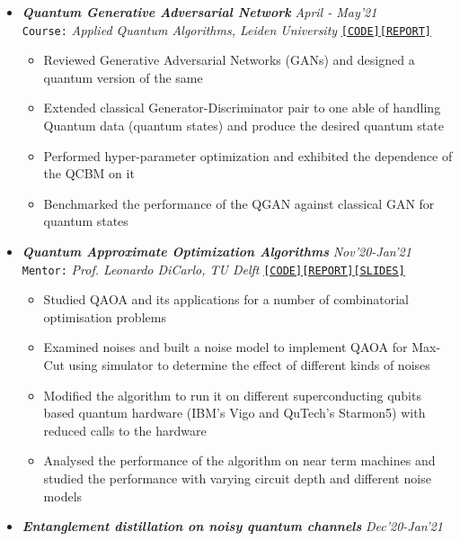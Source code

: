 \documentclass[11pt,a4paper]{article}
\begin{document}
\begin{itemize}
    \item \textbf{\textit{Quantum Generative Adversarial Network}} \hfill \textit{April - May'21}\\
    \texttt{Course:} \textit{Applied Quantum Algorithms, Leiden University} \hfill \href{https://github.com/smitchaudhary/QGANs}{\texttt{[CODE]}}\href{https://github.com/smitchaudhary/QGANs/blob/main/Report.pdf}{\texttt{[REPORT]}}
    \begin{itemize}
        \item Reviewed Generative Adversarial Networks (GANs) and designed a quantum version of the same
        \item Extended classical Generator-Discriminator pair to one able of handling Quantum data (quantum states) and produce the desired quantum state
        \item Performed hyper-parameter optimization and exhibited the dependence of the QCBM on it
        \item Benchmarked the performance of the QGAN against classical GAN for quantum states
    \end{itemize}
    \item \textbf{\textit{Quantum Approximate Optimization Algorithms}} \hfill \textit{Nov'20-Jan'21}\\
    \texttt{Mentor:} \textit{Prof. Leonardo DiCarlo, TU Delft} \hfill
    \href{https://github.com/smitchaudhary/QAOA-MaxCut}{\texttt{[CODE]}}\href{https://github.com/smitchaudhary/QAOA-MaxCut/blob/master/Report.pdf}{\texttt{[REPORT]}}\href{https://github.com/smitchaudhary/QAOA-MaxCut/blob/master/Presentation.pdf}{\texttt{[SLIDES]}}
    \begin{itemize}
        \item Studied QAOA and its applications for a number of combinatorial optimisation problems
        \item Examined noises and built a noise model to implement QAOA for Max-Cut using simulator to determine the effect of different kinds of noises
        \item Modified the algorithm to run it on different superconducting qubits based quantum hardware (IBM's Vigo and QuTech's Starmon5) with reduced calls to the hardware
        \item Analysed the performance of the algorithm on near term machines and studied the performance with varying circuit depth and different noise models
    \end{itemize}
    \item \textbf{\textit{Entanglement distillation on noisy quantum channels}} \hfill \textit{Dec'20-Jan'21}\\

\end{itemize}
\end{document}
